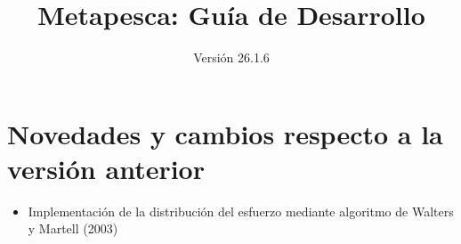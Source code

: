 \documentclass[12pt, oneside, a4paper]{article}
\title{Metapesca: Guía de Desarrollo}
\author{Versión 26.1.6}
\begin{document}
\maketitle



	\section{Novedades y cambios respecto a la versión anterior}
	
	\begin{itemize}
		\item Implementación de la distribución del esfuerzo mediante algoritmo de Walters y Martell (2003)
	\end{itemize}

			
\end{document}
